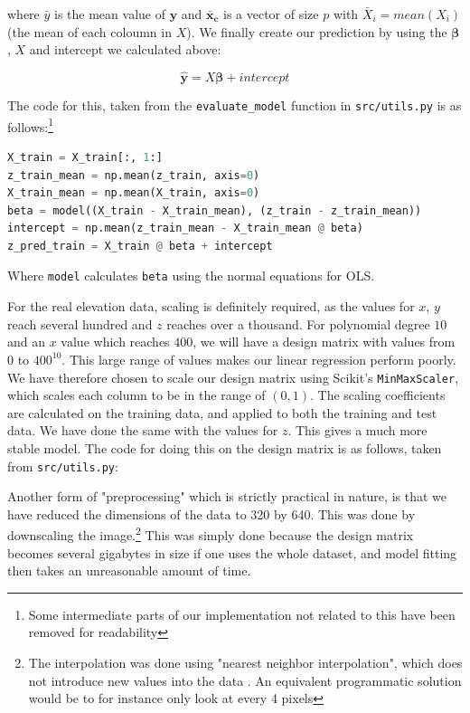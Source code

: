 \documentclass[twocolumn,10pt,cleanfoot]{asme2ej}
\begin{document}
	where $\bar{y}$ is the mean value of $\bm{y}$ and $\bm{\bar{x}_c}$ is a vector of size $p$ with $\bar{X}_i = mean(X_i)$ (the mean of each coloumn in $X$). We finally create our prediction by using the $\bm{\beta}$, $X$ and intercept we calculated above:

\begin{equation}
	\bm{\hat{y}} = X \bm{\beta} + intercept
\end{equation}

The code for this, taken from the \texttt{evaluate\_model} function in \texttt{src/utils.py} is as follows:\footnote{Some intermediate parts of our implementation not related to this have been removed for readability}

\begin{lstlisting}[language=Python]
X_train = X_train[:, 1:]
z_train_mean = np.mean(z_train, axis=0)
X_train_mean = np.mean(X_train, axis=0)
beta = model((X_train - X_train_mean), (z_train - z_train_mean))
intercept = np.mean(z_train_mean - X_train_mean @ beta)
z_pred_train = X_train @ beta + intercept
\end{lstlisting}

Where \texttt{model} calculates \texttt{beta} using the normal equations for OLS.

For the real elevation data, scaling is definitely required, as the values for $x$, $y$ reach several hundred and $z$ reaches over a thousand. For polynomial degree $10$ and an $x$ value which reaches $400$, we will have a design matrix with values from $0$ to $400^{10}$. This large range of values makes our linear regression perform poorly. We have therefore chosen to scale our design matrix using Scikit's \texttt{MinMaxScaler}, which scales each column to be in the range of $(0,1)$. The scaling coefficients are calculated on the training data, and applied to both the training and test data. We have done the same with the values for $z$. This gives a much more stable model. The code for doing this on the design matrix is as follows, taken from \texttt{src/utils.py}:



Another form of "preprocessing" which is strictly practical in nature, is that we have reduced the dimensions of the data to 320 by 640. This was done by downscaling the image.\footnote{The interpolation was done using "nearest neighbor interpolation", which does not introduce new values into the data \cite[77]{dip}. An equivalent programmatic solution would be to for instance only look at every 4 pixels} This was simply done because the design matrix becomes several gigabytes in size if one uses the whole dataset, and model fitting then takes an unreasonable amount of time.
\end{document}
